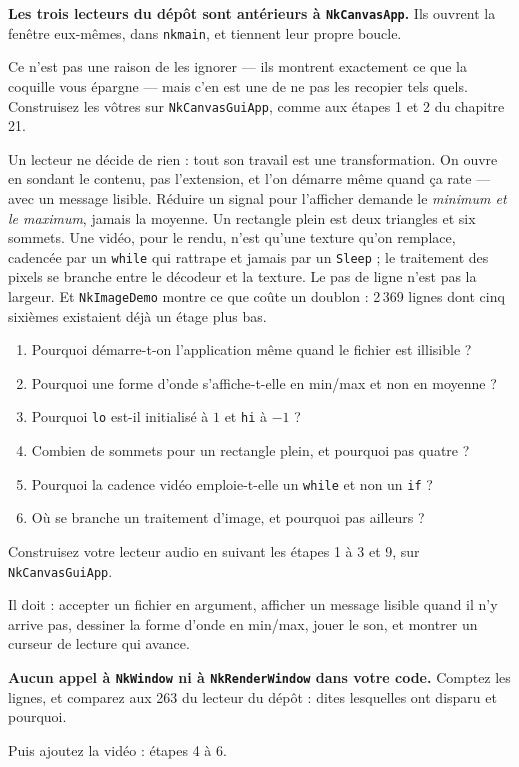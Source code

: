 \begin{nkpiege}
\textbf{Les trois lecteurs du dépôt sont antérieurs à \texttt{NkCanvasApp}.} Ils
ouvrent la fenêtre eux-mêmes, dans \texttt{nkmain}, et tiennent leur propre
boucle.

Ce n'est pas une raison de les ignorer --- ils montrent exactement ce que la
coquille vous épargne --- mais c'en est une de ne pas les recopier tels quels.
Construisez les vôtres sur \texttt{NkCanvasGuiApp}, comme aux étapes 1 et 2 du
chapitre 21.
\end{nkpiege}

\begin{nkbilan}
Un lecteur ne décide de rien : tout son travail est une transformation. On ouvre
en sondant le contenu, pas l'extension, et l'on démarre même quand ça rate ---
avec un message lisible. Réduire un signal pour l'afficher demande le
\emph{minimum et le maximum}, jamais la moyenne. Un rectangle plein est deux
triangles et six sommets. Une vidéo, pour le rendu, n'est qu'une texture qu'on
remplace, cadencée par un \texttt{while} qui rattrape et jamais par un
\texttt{Sleep} ; le traitement des pixels se branche entre le décodeur et la
texture. Le pas de ligne n'est pas la largeur. Et \texttt{NkImageDemo} montre ce
que coûte un doublon : 2\,369 lignes dont cinq sixièmes existaient déjà un étage
plus bas.
\end{nkbilan}

\begin{nkquestions}
\begin{enumerate}
\item Pourquoi démarre-t-on l'application même quand le fichier est illisible ?
\item Pourquoi une forme d'onde s'affiche-t-elle en min/max et non en moyenne ?
\item Pourquoi \texttt{lo} est-il initialisé à $1$ et \texttt{hi} à $-1$ ?
\item Combien de sommets pour un rectangle plein, et pourquoi pas quatre ?
\item Pourquoi la cadence vidéo emploie-t-elle un \texttt{while} et non un
      \texttt{if} ?
\item Où se branche un traitement d'image, et pourquoi pas ailleurs ?
\end{enumerate}
\end{nkquestions}

\begin{nkpratique}
Construisez votre lecteur audio en suivant les étapes 1 à 3 et 9, sur
\texttt{NkCanvasGuiApp}.

Il doit : accepter un fichier en argument, afficher un message lisible quand il
n'y arrive pas, dessiner la forme d'onde en min/max, jouer le son, et montrer un
curseur de lecture qui avance.

\textbf{Aucun appel à \texttt{NkWindow} ni à \texttt{NkRenderWindow} dans votre
code.} Comptez les lignes, et comparez aux 263 du lecteur du dépôt : dites
lesquelles ont disparu et pourquoi.

Puis ajoutez la vidéo : étapes 4 à 6.
\end{nkpratique}


